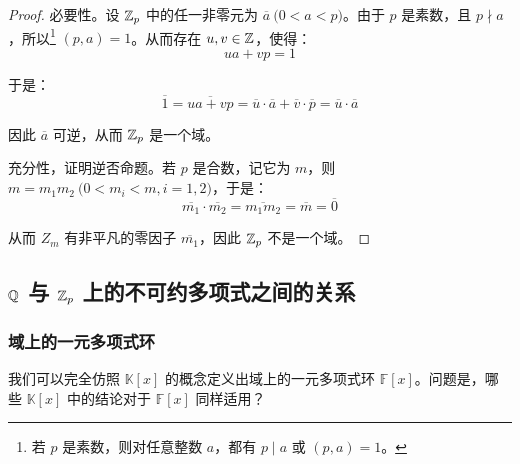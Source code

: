 \begin{proof}
	必要性。设 $\mathbb Z_p$ 中的任一非零元为 $\overline a \pod{0 < a < p}$。由于 $p$ 是素数，且 $p \nmid a$，所以\footnote{若 $p$ 是素数，则对任意整数 $a$，都有 $p \mid a$ 或 $(p, a) = 1$。} $(p, a) = 1$。从而存在 $u, v \in \mathbb Z$，使得：
	$$
	ua + vp = 1
	$$

	于是：
	$$
	\overline 1 = \overline{ua + vp} = \overline u \cdot \overline a + \overline v \cdot \overline p = \overline u \cdot \overline a
	$$

	因此 $\overline a$ 可逆，从而 $\mathbb Z_p$ 是一个域。

	\bigskip

	充分性，证明逆否命题。若 $p$ 是合数，记它为 $m$，则 $m = m_1 m_2 \pod{0 < m_i < m, i = 1, 2}$，于是：
	$$
	\overline{m_1} \cdot \overline{m_2} = \overline{m_1 m_2} = \overline m = \overline 0
	$$

	从而 $Z_m$ 有非平凡的零因子 $\overline{m_1}$，因此 $\mathbb Z_p$ 不是一个域。
\end{proof}

\subsection{$\mathbb Q$ 与 $\mathbb Z_p$ 上的不可约多项式之间的关系}

\subsubsection{域上的一元多项式环}

我们可以完全仿照 $\mathbb K[x]$ 的概念定义出域上的一元多项式环 $\mathbb F[x]$。问题是，哪些 $\mathbb K[x]$ 中的结论对于 $\mathbb F[x]$ 同样适用？

